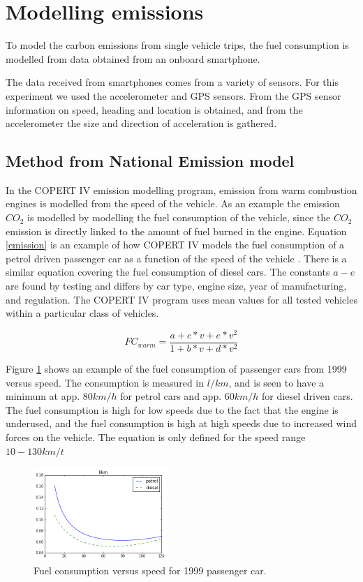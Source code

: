 \section{Modelling emissions}

To model the carbon emissions from single vehicle trips, the fuel consumption is modelled from data obtained from an onboard smartphone.

The data received from smartphones comes from a variety of sensors. For this experiment we used the accelerometer and GPS sensors. From the GPS sensor information on speed, heading and location is obtained, and from the accelerometer the size and direction of acceleration is gathered.

\subsection{Method from National Emission model}

In the COPERT IV emission modelling program, emission from warm combustion engines is modelled from the speed of the vehicle. As an example the emission $CO_2$ is modelled by modelling the fuel consumption of the vehicle, since the $CO_2$ emission is directly linked to the amount of fuel burned in the engine. Equation \ref{emission} is an example of how COPERT IV models the fuel consumption of a petrol driven passenger car as a function of the speed of the vehicle \cite{Ntziachristos2012}. There is a similar equation covering the fuel consumption of diesel cars. The constants $a-e$ are found by testing and differs by car type, engine size, year of manufacturing, and regulation. The COPERT IV program uses mean values for all tested vehicles within a particular class of vehicles.

\begin{equation}
	FC_{warm} = \frac{a + c*v + e*v^2}{1 + b*v + d*v^2}
	\label{emission}
\end{equation}

Figure \ref{FC} shows an example of the fuel consumption of passenger cars from 1999 versus speed. The consumption is measured in $l/km$, and is seen to have a minimum at app. $80 km/h$ for petrol cars and app. $60 km/h$ for diesel driven cars. The fuel consumption is high for low speeds due to the fact that the engine is underused, and the fuel consumption is high at high speeds due to increased wind forces on the vehicle. The equation is only defined for the speed range $10 - 130 km/t$
 
\begin{figure}[h]
	\centering
  \includegraphics[width=0.45\textwidth]{fc_dieselpetrol}
  \caption{Fuel consumption versus speed for 1999 passenger car.}
  \label{FC}
\end{figure}


